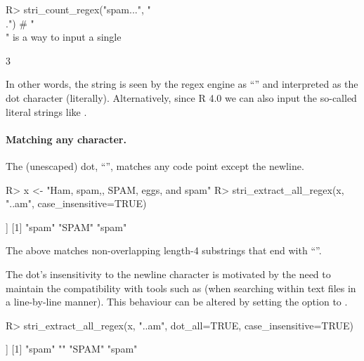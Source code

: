 \documentclass[nojss]{jss}
\begin{document}
\begin{Schunk}
\begin{Sinput}
R> stri_count_regex("spam...", "\\.")   # "\\" is a way to input a single \
\end{Sinput}
\begin{Soutput}
[1] 3
\end{Soutput}
\end{Schunk}

In other words, the  string 
is seen by the regex engine as ``\code{\textbackslash.}'' and interpreted
as the dot character (literally). Alternatively,
since R 4.0 we can also input the so-called literal strings
like .


\paragraph{Matching any character.}
The (unescaped) dot, ``'', matches any code point except the newline.

\begin{Schunk}
\begin{Sinput}
R> x <- "Ham, spam,\njam, SPAM, eggs, and spam"
R> stri_extract_all_regex(x, "..am", case_insensitive=TRUE)
\end{Sinput}
\begin{Soutput}
[[1]]
[1] "spam" "SPAM" "spam"
\end{Soutput}
\end{Schunk}

The above matches non-overlapping length-4 substrings that
end with ``''.

The dot's insensitivity to the newline character is motivated
by the need to maintain the compatibility with tools such as \pkg{grep}
(when searching within text files in a line-by-line manner).
This behaviour can be altered by setting the  option to \code{TRUE}.

\begin{Schunk}
\begin{Sinput}
R> stri_extract_all_regex(x, "..am", dot_all=TRUE, case_insensitive=TRUE)
\end{Sinput}
\begin{Soutput}
[[1]]
[1] "spam"  "\njam" "SPAM"  "spam"
\end{Soutput}
\end{Schunk}
\end{document}
